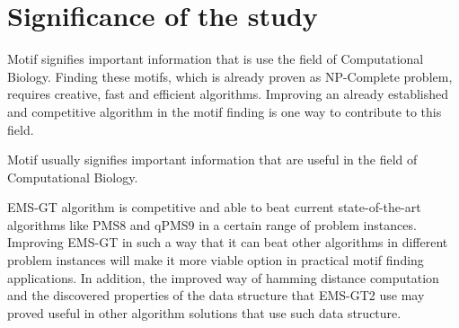 \section{Significance of the study}
Motif signifies important information that is use the field of Computational Biology. Finding these motifs, which is already proven as NP-Complete problem, requires creative, fast and efficient algorithms. Improving an already established and competitive algorithm in the motif finding is one way to contribute to this field.

Motif usually signifies important information that are useful in the field of Computational Biology. 


EMS-GT algorithm is competitive and able to beat current state-of-the-art algorithms like PMS8 and qPMS9 in a certain range of problem instances. Improving EMS-GT in such a way that it can beat other algorithms in different problem instances will make it more viable option in practical motif finding applications. In addition, the improved way of hamming distance computation and the discovered properties of the data structure that EMS-GT2 use may proved useful in other algorithm solutions that use such data structure.
